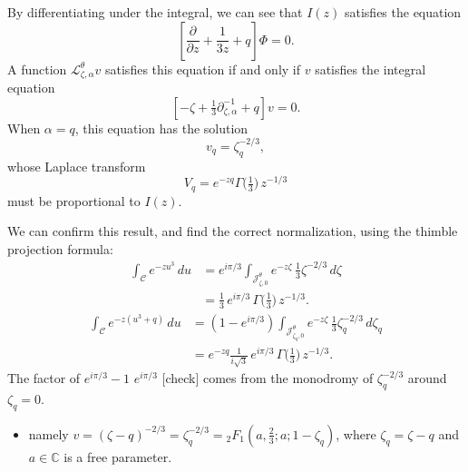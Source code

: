 \documentclass{article}
\newcommand{\C}{\mathbb{C}}
\newcommand{\laplace}{\mathcal{L}}
\theoremstyle{definition}
\theoremstyle{plain}
\newenvironment{todo}{\color{Coral}}{\color{black}}
\newenvironment{brainstorm}{\color{BlueViolet}\begin{itemize}}{\end{itemize}\color{black}}
\newenvironment{old}{\color{RoyalBlue}}{\color{black}}
\newenvironment{revised}{\color{DarkBlue}}{\color{black}}
\begin{document}
\begin{itemize}
By differentiating under the integral, we can see that $I(z)$ satisfies the equation
\begin{equation}\label{eqn:degree-3-poly-1root}
\left[\frac{\partial}{\partial z} + \frac{1}{3z} +q \right] \Phi = 0.
\end{equation}
A function $\laplace_{\zeta,\alpha}^{\theta} v$ satisfies this equation if and only if $v$ satisfies the integral equation
\[ \left[ -\zeta + \tfrac{1}{3} \partial^{-1}_{\zeta, \alpha} +q  \right] v = 0. \]
When $\alpha = q$, this equation has the solution
\[ v_q = \zeta_q^{-2/3}, \]
whose Laplace transform
\[ V_q = e^{-zq} \Gamma\big(\tfrac{1}{3})\,z^{-1/3} \]
must be proportional to $I(z)$.

We can confirm this result, and find the correct normalization, using the thimble projection formula:
\begin{old}
\begin{align*}
\int_{\mathcal{C}} e^{-zu^3}\,du & = e^{i\pi/3} \int_{\mathcal{J}_{\zeta, 0}^\theta} e^{-z\zeta}\,\tfrac{1}{3}\zeta^{-2/3}\,d\zeta \\
& = \tfrac{1}{3}\,e^{i\pi/3}\,\Gamma\big(\tfrac{1}{3})\,z^{-1/3}.
\end{align*}
\end{old}
\begin{revised}
\begin{align*}
\int_{\mathcal{C}} e^{-z(u^3+q)}\,du & = (1 - e^{i\pi/3}) \int_{\mathcal{J}_{\zeta_q, 0}^\theta} e^{-z\zeta}\,\tfrac{1}{3}\zeta_q^{-2/3}\,d\zeta_q \\
& = e^{-zq}\tfrac{1}{i\sqrt{3}}\,e^{i\pi/3}\,\Gamma\big(\tfrac{1}{3})\,z^{-1/3}.
\end{align*}
\end{revised}
The factor of \begin{revised}$e^{i\pi/3} - 1$\end{revised} \begin{old}$e^{i\pi/3}$\end{old} \begin{todo}[check]\end{todo} comes from the monodromy of $\zeta_q^{-2/3}$ around $\zeta_q = 0$.
\begin{brainstorm}
\item namely $v=(\zeta-q)^{-2/3}=\zeta_q^{-2/3}={}_2F_1\left(a,\frac{2}{3};a;1-\zeta_q\right)$, where $\zeta_q=\zeta-q$ and $a\in\C$ is a free parameter.
\end{brainstorm}
\end{itemize}
\end{document}
